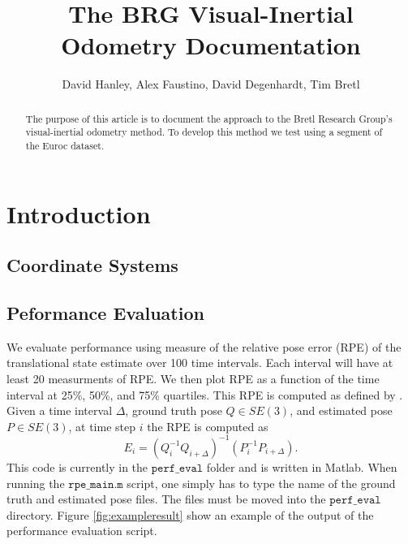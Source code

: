 \documentclass[11pt,a4paper]{article}
\title{The BRG Visual-Inertial Odometry Documentation}
\author{David Hanley, Alex Faustino, David Degenhardt, Tim Bretl}
\begin{document}
\maketitle

\begin{abstract}
 The purpose of this article is to document the approach to the Bretl Research Group's visual-inertial odometry method. To develop this method we test using a segment of the Euroc dataset.
\end{abstract}

\section{Introduction}

\subsection{Coordinate Systems}

\subsection{Peformance Evaluation}
We evaluate performance using measure of the relative pose error (RPE) of the translational state estimate over 100 time intervals. Each interval will have at least 20 measurments of RPE. We then plot RPE as a function of the time interval at 25\%, 50\%, and 75\% quartiles. This RPE is computed as defined by  \cite{Sturm:2012}. Given a time interval $\Delta$, ground truth pose $Q\in SE(3)$, and estimated pose $P\in SE(3)$, at time step $i$ the RPE is computed as
\begin{equation}
	E_i = \left(Q_i^{-1}Q_{i+\Delta}\right)^{-1}\left(P_i^{-1}P_{i+\Delta}\right).
\end{equation}
This code is currently in the $\texttt{perf\_eval}$ folder and is written in Matlab. When running the $\texttt{rpe\_main.m}$ script, one simply has to type the name of the ground truth and estimated pose files. The files must be moved into the $\texttt{perf\_eval}$ directory. Figure \ref{fig:exampleresult} show an example of the output of the performance evaluation script.
\end{document}
